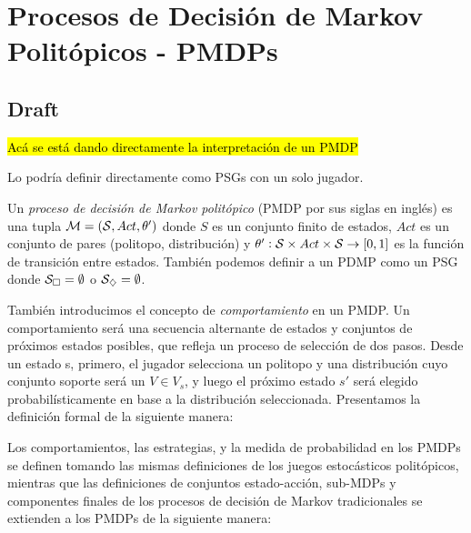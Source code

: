 \section{Procesos de Decisión de Markov Politópicos - PMDPs}

\subsection{Draft}

\hl{Acá se está dando directamente la interpretación de un PMDP}

Lo podría definir directamente como PSGs con un solo jugador.

\begin{definition}
	Un \textit{proceso de decisión de Markov politópico} (PMDP por sus siglas en inglés) es una tupla $\mathcal{M} = (\mathcal{S}, Act, \theta')$ donde $S$ es un conjunto finito de estados, $Act$ es un conjunto de pares (politopo, distribución) y $\theta': \mathcal{S} \times Act \times \mathcal{S} \rightarrow [0, 1]$ es la función de transición entre estados. También podemos definir a un PDMP como un PSG donde $\mathcal{S}_\square = \emptyset$ o $\mathcal{S}_\diamondsuit = \emptyset$.
\end{definition}

También introducimos el concepto de \textit{comportamiento} en un PMDP. Un
comportamiento será una secuencia alternante de estados y conjuntos de próximos
estados posibles, que refleja un proceso de selección de dos pasos. Desde un
estado s, primero, el jugador selecciona un politopo y una distribución cuyo
conjunto soporte será un $V \in V_s$, y luego el próximo estado $s'$ será
elegido probabilísticamente en base a la distribución seleccionada. Presentamos
la definición formal de la siguiente manera:

Los comportamientos, las estrategias, y la medida de probabilidad en los PMDPs
se definen tomando las mismas definiciones de los juegos estocásticos
politópicos, mientras que las definiciones de conjuntos estado-acción, sub-MDPs
y componentes finales de los procesos de decisión de Markov tradicionales se
extienden a los PMDPs de la siguiente manera:

